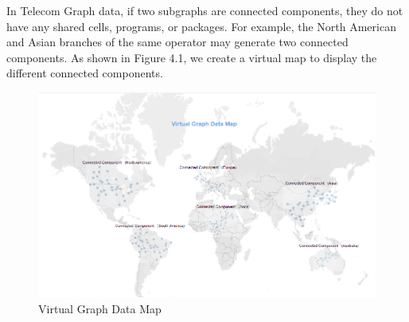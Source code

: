 \documentclass[ %
                    author={Tengyao Tu},
                supervisor={Dr. James Pope},
                    degree={MSc},
                     title={A New Perspective on Graph Community Detection: Combining Traditional Methods with Deep Learning Approaches},
                  subtitle={Applying to Telecom Networks and Diverse Datasets},
                      type={},
                      year={2024}]{dissertation}
\begin{document}
In Telecom Graph data, if two subgraphs are connected components, they do not have any shared cells, programs, or packages. For example, the North American and Asian branches of the same operator may generate two connected components. As shown in Figure 4.1, we create a virtual map to display the different connected components.
\begin{figure}[h!] %
    \centering
    \includegraphics[width=1.0\textwidth]{Figure_5.png} %
    \caption{Virtual Graph Data Map}
    \label{virtual Graph Data Map}
\end{figure}
\end{document}
